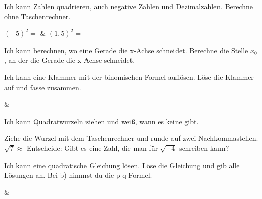 \setcounter{aufgabe}{0}

\begin{aufgabe}{Ich kann Zahlen quadrieren, auch negative Zahlen und Dezimalzahlen. Berechne ohne Taschenrechner.}
\begin{teilezwei}
\tz $(-5)^2 =$ \leerfeld & \tz $(1{,}5)^2 =$ \leerfeld \\
\end{teilezwei}
\end{aufgabe}

\begin{aufgabe}{Ich kann berechnen, wo eine Gerade die x-Achse schneidet. Berechne die Stelle $x_0$, an der die Gerade die x-Achse schneidet.}
\end{aufgabe}

\begin{aufgabe}{Ich kann eine Klammer mit der binomischen Formel auflösen. Löse die Klammer auf und fasse zusammen.}
\begin{gleichungsraster}[2]
 &  \\
\end{gleichungsraster}
\end{aufgabe}

\begin{aufgabe}{Ich kann Quadratwurzeln ziehen und weiß, wann es keine gibt.}
\begin{teile}
\teil Ziehe die Wurzel mit dem Taschenrechner und runde auf zwei Nachkommastellen. \\ $\sqrt{7} \approx$ \leerfeld
\teil Entscheide: Gibt es eine Zahl, die man für $\sqrt{-4}$ schreiben kann? \quad \janein
\end{teile}
\end{aufgabe}

\begin{aufgabe}{Ich kann eine quadratische Gleichung lösen. Löse die Gleichung und gib alle Lösungen an. Bei b) nimmst du die p-q-Formel.}
\begin{gleichungsraster}[3]
 &  \\
\end{gleichungsraster}
\end{aufgabe}
